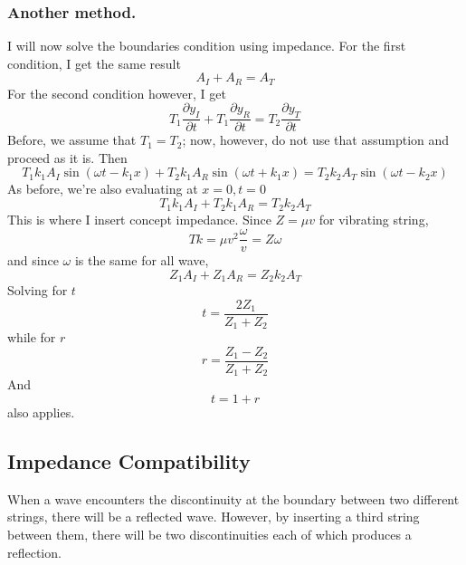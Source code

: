 \documentclass[../../../main.tex]{subfiles}
\begin{document}
\subsubsection*{Another method.} I will now solve the boundaries condition using impedance. For the first condition, I get the same result
\begin{equation*}
    A_I+A_R=A_T
\end{equation*}
For the second condition however, I get 
\begin{equation*}
    T_1\frac{\partial y_I}{\partial t}+T_1\frac{\partial y_R}{\partial t}=T_2\frac{\partial y_T}{\partial t}
\end{equation*}
Before, we assume that $T_1=T_2$; now, however, do not use that assumption and proceed as it is. Then 
\begin{equation*}
    T_1k_1A_I \sin(\omega t - k_1x)+ T_2k_1A_R \sin(\omega t + k_1x) =  T_2k_2A_T \sin(\omega t - k_2x)
\end{equation*}
As before, we're also evaluating at $x=0, t=0$
\begin{equation*}
    T_1k_1A_I + T_2k_1A_R  =  T_2k_2A_T
\end{equation*}
This is where I insert concept impedance. Since $Z=\mu v$ for vibrating string, 
\begin{equation*}
    Tk=\mu v^2\frac{\omega}{v}=Z\omega
\end{equation*}
and since $\omega$ is the same for all wave,
\begin{equation*}
    Z_1A_I +Z_1A_R  =  Z_2k_2A_T
\end{equation*}
Solving for $t$
\begin{equation*}
    t=\frac{2Z_1}{Z_1+Z_2}
\end{equation*}
while for $r$
\begin{equation*}
    r =\frac{Z_1-Z_2}{Z_1+Z_2}
\end{equation*}
And 
\begin{equation*}
    t=1+r
\end{equation*}
also applies.

\subsection*{Impedance Compatibility}

When a wave encounters the discontinuity at the boundary between two different strings, there will be a reﬂected wave. However, by inserting a third string between them, there will be two discontinuities each of which produces a reﬂection. 
\end{document}
